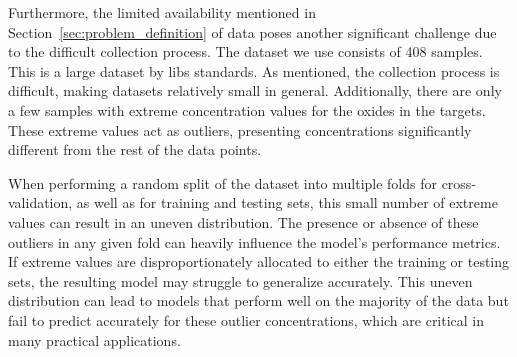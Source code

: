 Furthermore, the limited availability mentioned in Section~\ref{sec:problem_definition} of data poses another significant challenge due to the difficult collection process.
The dataset we use consists of 408 samples. This is a large dataset by \gls{libs} standards.
As mentioned, the collection process is difficult, making datasets relatively small in general.
Additionally, there are only a few samples with extreme concentration values for the oxides in the targets.
These extreme values act as outliers, presenting concentrations significantly different from the rest of the data points.

When performing a random split of the dataset into multiple folds for cross-validation, as well as for training and testing sets, this small number of extreme values can result in an uneven distribution.
The presence or absence of these outliers in any given fold can heavily influence the model's performance metrics.
If extreme values are disproportionately allocated to either the training or testing sets, the resulting model may struggle to generalize accurately.
This uneven distribution can lead to models that perform well on the majority of the data but fail to predict accurately for these outlier concentrations, which are critical in many practical applications.

